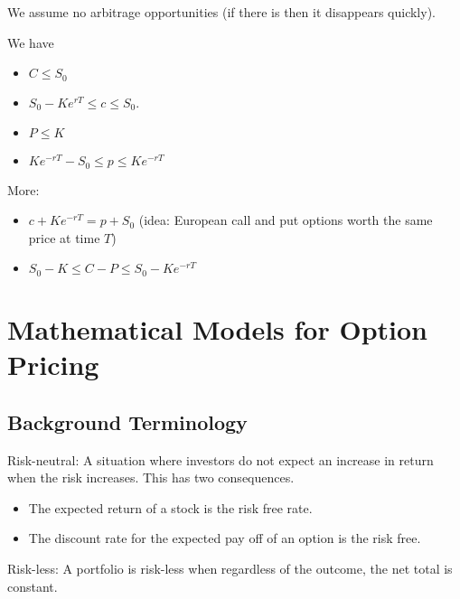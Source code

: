 \documentclass[a4paper]{article}
\begin{document}
We assume no arbitrage opportunities (if there is then it disappears quickly). 

We have 
\begin{itemize}
\item $C\leq S_0$
\item $S_0-Ke^{rT}\leq c\leq S_0$. 
\item $P\leq K$
\item $Ke^{-rT}-S_0\leq p\leq Ke^{-rT}$
\end{itemize}

More:
\begin{itemize}
\item $c+Ke^{-rT}=p+S_0$ (idea: European call and put options worth the same price at time $T$)
\item $S_0-K\leq C-P\leq S_0-Ke^{-rT}$
\end{itemize}



\pagebreak
\section{Mathematical Models for Option Pricing}
\subsection{Background Terminology}
Risk-neutral: A situation where investors do not expect an increase in return when the risk increases. This has two consequences. 
\begin{itemize}
\item The expected return of a stock is the risk free rate. 
\item The discount rate for the expected pay off of an option is the risk free. 
\end{itemize}

Risk-less: A portfolio is risk-less when regardless of the outcome, the net total is constant. 
\end{document}
